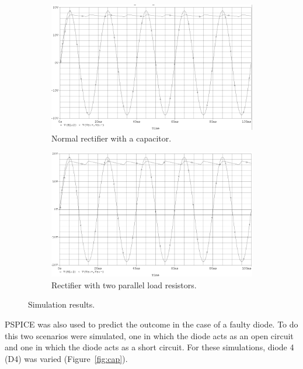 \documentclass[12pt]{article}
\begin{document}
\begin{figure}[h!]
\centering
\begin{subfigure}[b]{0.45\textwidth}
\includegraphics[width=\textwidth]{out_norm}
\caption{Normal rectifier with a capacitor.}
\label{fig:norm}
\end{subfigure}
\qquad
\begin{subfigure}[b]{0.45\textwidth}
\includegraphics[width=\textwidth]{out_res}
\caption{Rectifier with two parallel load resistors.}
\label{fig:res}
\end{subfigure}
\caption{Simulation results.}
\label{fig:sim}
\end{figure}

PSPICE was also used to predict the outcome in the case of a faulty diode. To do this two scenarios were simulated, one in which the diode acts as an open circuit and one in which the diode acts as a short circuit. For these simulations, diode 4 (D4) was varied (Figure~\ref{fig:cap}).
\end{document}

